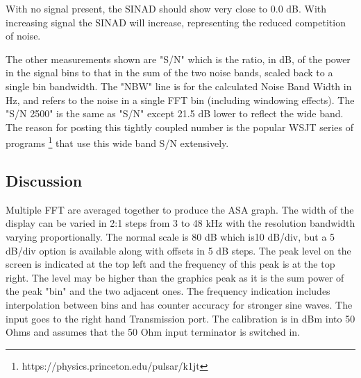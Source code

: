 With no signal present, the SINAD should show very close to 0.0 dB.  With increasing signal the SINAD will increase, representing the reduced competition of noise. 

The other measurements shown are "S/N" which is the ratio, in dB, of the power in the signal bins to that in the sum of the two noise bands, scaled back to a single bin bandwidth.   The "NBW"  line is for the calculated Noise Band Width in Hz, and refers to the noise in a single FFT bin (including windowing effects).   The "S/N 2500" is the same as "S/N" except 21.5 dB lower to reflect the wide band.  The reason for posting this tightly coupled number is the popular WSJT series of programs
%
\footnote{https://physics.princeton.edu/pulsar/k1jt}
%
that use this wide band S/N extensively.

\subsection{Discussion}
Multiple FFT are averaged together to produce the ASA graph.  The width of the display can be varied in 2:1 steps from 3 to 48 kHz with the resolution bandwidth varying proportionally.  The normal scale is 80 dB which is10 dB/div, but a 5 dB/div option is available along with offsets in 5 dB steps.  The peak level on the screen is indicated at the top left and the frequency of this peak is at the top right.  The level may be higher than the graphics peak as it is the sum power of the peak "bin" and the two adjacent ones.  The frequency indication includes interpolation between bins and has counter accuracy for stronger sine waves.  The input goes to the right hand Transmission port.  The calibration is in dBm into 50 Ohms and assumes that the 50 Ohm input terminator is switched in.
